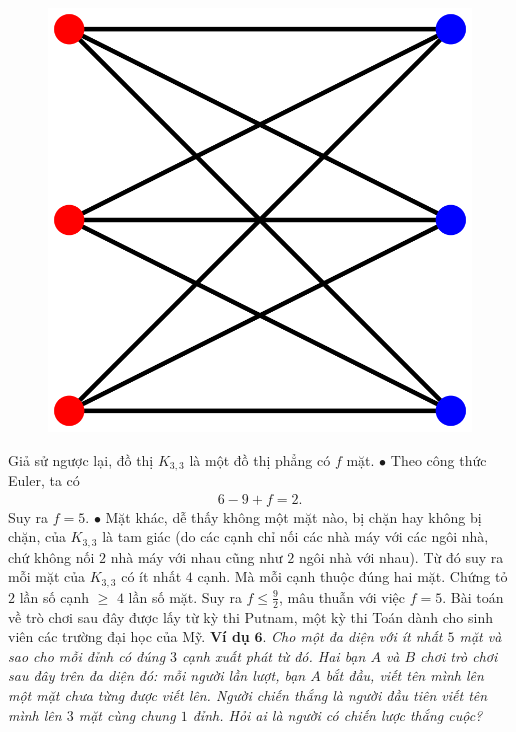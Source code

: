 \begin{multicols}{2}
\begin{figure}[H]
		\includegraphics[scale=0.15]{K3_3}
		\vspace*{-10pt}
	\end{figure}
	Giả sử ngược lại, đồ thị $K_{3,3}$ là một đồ thị phẳng có $f$ mặt. 
	\vskip 0.1cm
	$\bullet$ Theo công thức Euler, ta có
	\begin{align*}
		6 - 9 + f = 2.
	\end{align*}
	Suy ra $f=5$.
	\vskip 0.1cm
	$\bullet$  Mặt khác, dễ thấy không một mặt nào, bị chặn hay không bị chặn, của $K_{3, 3}$ là tam giác (do các cạnh chỉ nối các nhà máy với các ngôi nhà, chứ không nối $2$ nhà máy với nhau cũng như $2$ ngôi nhà với nhau). Từ đó suy ra mỗi mặt của $K_{3,3}$ có ít nhất $4$ cạnh. Mà mỗi cạnh thuộc đúng hai mặt. Chứng tỏ $2$ lần số cạnh $ \geq $ $4$ lần số mặt. Suy ra $f \leq \frac{9}{2}$, mâu thuẫn với việc $f=5$.
	\vskip 0.1cm
	Bài toán về trò chơi sau đây được lấy từ kỳ thi Putnam, một kỳ thi Toán dành cho sinh viên các trường đại học của Mỹ. 
	\vskip 0.1cm
	\textbf{\color{hoccungpi}Ví dụ} $\pmb{6.}$
	\textit{Cho một đa diện với ít nhất $5$ mặt và sao cho mỗi đỉnh có đúng $3$ cạnh xuất phát từ đó. Hai bạn $A$ và $B$ chơi trò chơi sau đây trên đa diện đó: mỗi người lần lượt, bạn $A$ bắt đầu, viết tên mình lên một mặt chưa từng được viết lên. Người chiến thắng là người đầu tiên viết tên mình lên $3$ mặt cùng chung $1$ đỉnh. Hỏi ai là người có chiến lược thắng cuộc?}

\end{multicols}
